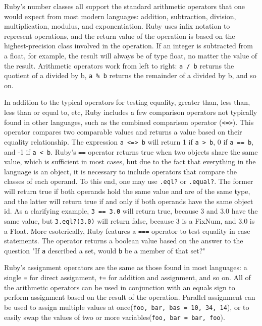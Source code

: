 \documentclass[12pt]{article}
\begin{document}
Ruby's number classes all support the standard arithmetic operators that one would expect from most modern languages: addition, subtraction, division, multiplication, modulus, and exponentiation. Ruby uses infix notation to represent operations, and the return value of the operation is based on the highest-precision class involved in the operation. If an integer is subtracted from a float, for example, the result will always be of type float, no matter the value of the result. Arithmetic operators work from left to right: \verb|a / b| returns the quotient of a divided by b, \verb|a % b| returns the remainder of a divided by b, and so on\cite{opstut}.

In addition to the typical operators for testing equality, greater than, less than, less than or equal to, etc, Ruby includes a few comparison operators not typically found in other languages, such as the combined comparison operator (\verb|<=>|). This operator compares two comparable values and returns a value based on their equality relationship. The expression \verb|a <=> b| will return 1 if \verb|a > b|, 0 if \verb|a == b|, and -1 if \verb|a < b|. Ruby's \verb|==| operator returns true when two objects share the same value, which is sufficient in most cases, but due to the fact that everything in the language is an object, it is necessary to include operators that compare the classes of each operand. To this end, one may use \verb|.eql?| or \verb|.equal?|. The former will return true if both operands hold the same value and are of the same type, and the latter will return true if and only if both operands have the same object id. As a clarifying example, \verb|3 == 3.0| will return true, because 3 and 3.0 have the same value, but \verb|3.eql?(3.0)| will return false, because 3 is a FixNum, and 3.0 is a Float. More esoterically, Ruby features a \verb|===| operator to test equality in case statements. The operator returns a boolean value based on the answer to the question "If \verb|a| described a set, would \verb|b| be a member of that set?"\cite{mittag}\cite{opstut}

Ruby's assignment operators are the same as those found in most languages: a single \verb|=| for direct assignment, \verb|+=| for addition and assignment, and so on. All of the arithmetic operators can be used in conjunction with an equals sign to perform assignment based on the result of the operation. Parallel assignment can be used to assign multiple values at once(\verb|foo, bar, bas = 10, 34, 14|), or to easily swap the values of two or more variables(\verb|foo, bar = bar, foo|)\cite{opstut}.
\end{document}

